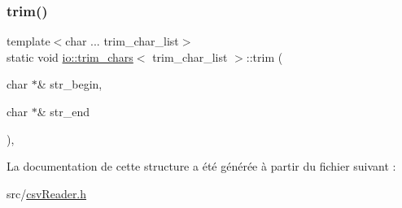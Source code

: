 \subsubsection{\texorpdfstring{trim()}{trim()}}
{\footnotesize\ttfamily template$<$char ... trim\+\_\+char\+\_\+list$>$ \\
static void \hyperlink{structio_1_1trim__chars}{io\+::trim\+\_\+chars}$<$ trim\+\_\+char\+\_\+list $>$\+::trim (\begin{DoxyParamCaption}\item[{char $\ast$\&}]{str\+\_\+begin,  }\item[{char $\ast$\&}]{str\+\_\+end }\end{DoxyParamCaption})\hspace{0.3cm}{\ttfamily [inline]}, {\ttfamily [static]}}



La documentation de cette structure a été générée à partir du fichier suivant \+:\begin{DoxyCompactItemize}
\item 
src/\hyperlink{csvReader_8h}{csv\+Reader.\+h}\end{DoxyCompactItemize}
